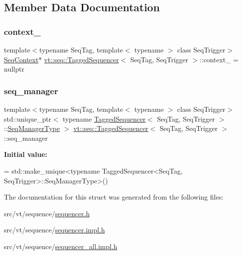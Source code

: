 \subsection{Member Data Documentation}
\mbox{\label{structvt_1_1seq_1_1_tagged_sequencer_a57d1b3af64ea25946f7431237ee1acd8}} 
\subsubsection{\texorpdfstring{context\+\_\+}{context\_}}
{\footnotesize\ttfamily template$<$typename Seq\+Tag, template$<$ typename $>$ class Seq\+Trigger$>$ \\
\hyperlink{structvt_1_1seq_1_1_seq_context}{Seq\+Context}$\ast$ \hyperlink{structvt_1_1seq_1_1_tagged_sequencer}{vt\+::seq\+::\+Tagged\+Sequencer}$<$ Seq\+Tag, Seq\+Trigger $>$\+::context\+\_\+ = nullptr\hspace{0.3cm}{\ttfamily [protected]}}

\mbox{\label{structvt_1_1seq_1_1_tagged_sequencer_a2c5fd9d4885dc33df2ee11111f9b76be}} 
\subsubsection{\texorpdfstring{seq\+\_\+manager}{seq\_manager}}
{\footnotesize\ttfamily template$<$typename Seq\+Tag, template$<$ typename $>$ class Seq\+Trigger$>$ \\
std\+::unique\+\_\+ptr$<$ typename \hyperlink{structvt_1_1seq_1_1_tagged_sequencer}{Tagged\+Sequencer}$<$ Seq\+Tag, Seq\+Trigger $>$\+::\hyperlink{structvt_1_1seq_1_1_tagged_sequencer_a892e0a759dc975bf74e35f9ebf7a2967}{Seq\+Manager\+Type} $>$ \hyperlink{structvt_1_1seq_1_1_tagged_sequencer}{vt\+::seq\+::\+Tagged\+Sequencer}$<$ Seq\+Tag, Seq\+Trigger $>$\+::seq\+\_\+manager\hspace{0.3cm}{\ttfamily [static]}}

{\bfseries Initial value\+:}
\begin{DoxyCode}
=
    std::make\_unique<typename TaggedSequencer<SeqTag, SeqTrigger>::SeqManagerType>()
\end{DoxyCode}


The documentation for this struct was generated from the following files\+:\begin{DoxyCompactItemize}
\item 
src/vt/sequence/\hyperlink{sequencer_8h}{sequencer.\+h}\item 
src/vt/sequence/\hyperlink{sequencer_8impl_8h}{sequencer.\+impl.\+h}\item 
src/vt/sequence/\hyperlink{sequencer__all_8impl_8h}{sequencer\+\_\+all.\+impl.\+h}\end{DoxyCompactItemize}
